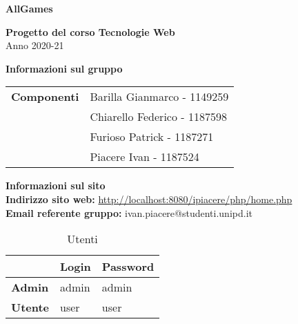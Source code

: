 \begin{center}
	\textbf{\Huge{AllGames}}\\
	\vspace{15pt}
\end{center}

\vspace{1.5cm}

\begin{center}
	\textbf{\huge{Progetto del corso Tecnologie Web}}\\[0.2cm]
	\Large{Anno 2020-21}
\end{center}

\vspace{5pt}

\begin{center}
	\textbf{\Large{Informazioni sul gruppo}}
\begin{table}[H]
	\hspace{3.5cm}
	\renewcommand{\arraystretch}{1.4}
	\begin{tabular}{l | l}
		\textbf{Componenti} & Barilla Gianmarco - 1149259\\
		& Chiarello Federico - 1187598\\
		& Furioso Patrick - 1187271\\
		& Piacere Ivan - 1187524\\
	\end{tabular}
\end{table}
\end{center}

\hspace{5pt}

\begin{center}
	\textbf{\Large{Informazioni sul sito}}\\
	\textbf{Indirizzo sito web:} \url{http://localhost:8080/ipiacere/php/home.php}\\
	\textbf{Email referente gruppo:} ivan.piacere@studenti.unipd.it

	\renewcommand{\arraystretch}{1.8}
	\begin{longtable}[H]{| p{.18\hsize} | p{.18\hsize} | p{.18\hsize} |}
		\caption{Utenti}\\
		\rowcolor[HTML]{C14638}
	\multicolumn{1}{c}{\color[HTML]{FFFFFF} \textbf{Utente}} &
		\multicolumn{1}{c}{\color[HTML]{FFFFFF} \textbf{Login}} &
		\multicolumn{1}{c}{\color[HTML]{FFFFFF} \textbf{Password}} \\
		\endhead
		
		\textbf{Admin} & admin & admin\\
		\hline
		\textbf{Utente} & user & user\\
		\hline
	\end{longtable}
\end{center}




